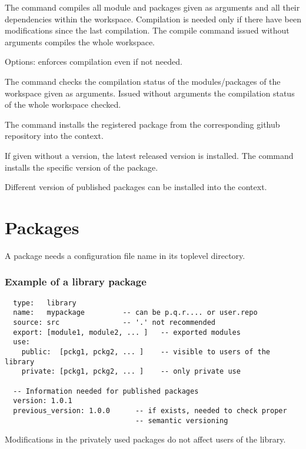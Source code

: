 \begin{description}
\begin{description}
  \end{description}

\item[\code{compile}] The command 
  compiles all module and packages given as arguments and all their
  dependencies within the workspace. Compilation is needed only if there have
  been modifications since the last compilation. The compile command issued
  without arguments compiles the whole workspace.

  Options:  enforces compilation even if not needed.

\item[\code{status}] The command  checks
  the compilation status of the modules/packages of the workspace given as
  arguments. Issued without arguments the compilation status of the whole
  workspace checked.


\item[\code{install}] The command  installs the
  registered package  from the corresponding github
  repository into the context.

  If given without a version, the latest released version is installed. The
  command  installs the specific version of
  the package.

  Different version of published packages can be installed into the context.


\item[\code{remove}]


\item[\code{publish}]

\end{description}



\section{Packages}

A package needs a configuration file name  in its
toplevel directory.

\subsubsection{ Example of a library package}
{\small
\begin{verbatim}
  type:   library
  name:   mypackage         -- can be p.q.r.... or user.repo
  source: src               -- '.' not recommended
  export: [module1, module2, ... ]   -- exported modules
  use:
    public:  [pckg1, pckg2, ... ]    -- visible to users of the library
    private: [pckg1, pckg2, ... ]    -- only private use

  -- Information needed for published packages
  version: 1.0.1
  previous_version: 1.0.0      -- if exists, needed to check proper
                               -- semantic versioning
\end{verbatim}
}
%
Modifications in the privately used packages do not affect users of the
library.



